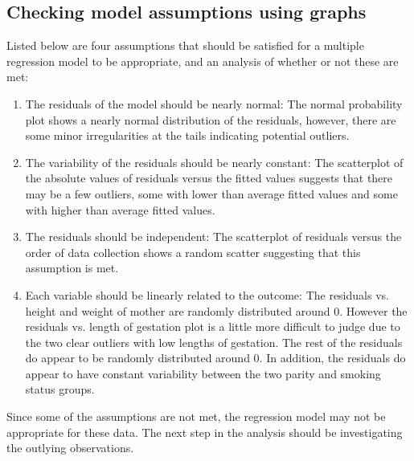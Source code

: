 
\subsection{Checking model assumptions using graphs}



{
Listed below are four assumptions that should be satisfied for a multiple regression model to be appropriate, and an analysis of whether or not these are met:
\begin{enumerate}[1.]
\item The residuals of the model should be nearly normal: The normal probability plot shows a nearly normal distribution of the residuals, however, there are some minor irregularities at the tails indicating potential outliers.
\item The variability of the residuals should be nearly constant: The scatterplot of the absolute values of residuals versus the fitted values suggests that there may be a few outliers, some with lower than average fitted values and some with higher than average fitted values.
\item The residuals should be independent: The scatterplot of residuals versus the order of data collection shows a random scatter suggesting that this assumption is met.
\item Each variable should be linearly related to the outcome: The residuals vs. height and weight of mother are randomly distributed around 0. However the residuals vs. length of gestation plot is a little more difficult to judge due to the two clear outliers with low lengths of gestation. The rest of the residuals do appear to be randomly distributed around 0. In addition, the residuals do appear to have constant variability between the two parity and smoking status groups.
\end{enumerate}
Since some of the assumptions are not met, the regression model may not be appropriate for these data. The next step in the analysis should be investigating the outlying observations.
}

